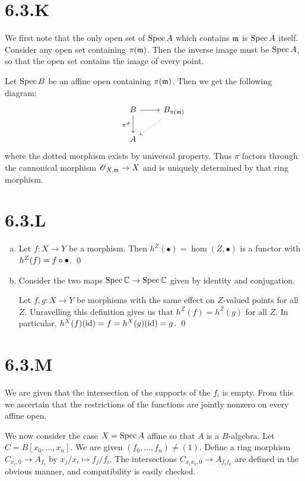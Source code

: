 \documentclass{article}
\begin{document}
\section{6.3.K}
We first note that the only open set of $\operatorname{Spec} A$ which contains $\mathfrak{m}$ is $\operatorname{Spec} A$ itself. Consider any open set containing $\pi(\mathfrak{m})$. Then the inverse image must be $\operatorname{Spec} A$, so that the open set contains the image of every point.

Let $\operatorname{Spec} B$ be an affine open containing $\pi(\mathfrak{m})$. Then we get the following diagram:
\[
    \begin{tikzcd}
        B \ar[r] \ar[d, "\pi^{\#}", swap] & B_{\pi(\m)} \ar[dl, dotted] \\
        A
    \end{tikzcd}
\]
where the dotted morphism exists by universal property. Thus $\pi$ factors through the cannonical morphism $\operatorname{\mathscr{O}}_{X,\mathfrak{m}} \to X$ and is uniquely determined by that ring morphism.

\section{6.3.L}
\begin{enumerate}[a.]
    \item Let $f: X \to Y$ be a morphism. Then $h^Z(\bullet)=\hom(Z, \bullet)$ is a functor with $h^Z(f)=f \circ \bullet$. \qed
    \item Consider the two maps $\operatorname{Spec} \mathbb{C} \to \operatorname{Spec} \mathbb{C}$ given by identity and conjugation.

          Let $f, g: X \to Y$ be morphisms with the same effect on $Z$-valued points for all $Z$. Unravelling this definition gives us that $h^Z(f)=h^Z(g)$ for all $Z$. In particular, $h^X(f)(\operatorname{id})=f=h^X(g)(\operatorname{id})=g$. \qed
\end{enumerate}

\section{6.3.M}
We are given that the intersection of the supports of the $f_i$ is empty. From this we ascertain that the restrictions of the functions are jointly nonzero on every affine open.

We now consider the case $X=\operatorname{Spec} A$ affine so that $A$ is a $B$-algebra. Let $C=B[x_0, \dots, x_n]$. We are given $(f_0, \dots, f_n) \neq (1)$. Define a ring morphism $C_{x_i,0} \to A_{f_i}$ by $x_j/x_i \mapsto f_j/f_i$. The intersections $C_{x_ix_k,0} \to A_{f_if_k}$ are defined in the obvious manner, and compatibility is easily checked.
\end{document}
